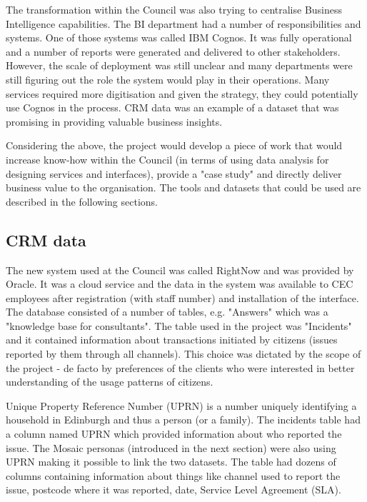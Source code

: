The transformation within the Council was also trying to centralise Business Intelligence capabilities. The BI department had a number of responsibilities and systems. One of those systems was called IBM Cognos. It was fully operational and a number of reports were generated and delivered to other stakeholders. However, the scale of deployment was still unclear and many departments were still figuring out the role the system would play in their operations. Many services required more digitisation and given the strategy, they could potentially use Cognos in the process. CRM data was an example of a dataset that was promising in providing valuable business insights.

Considering the above, the project would develop a piece of work that would increase know-how within the Council (in terms of using data analysis for designing services and interfaces), provide a "case study" and directly deliver business value to the organisation. The tools and datasets that could be used are described in the following sections.

		\subsection{CRM data}
		
The new system used at the Council was called RightNow and was provided by Oracle. It was a cloud service and the data in the system was available to CEC employees after registration (with staff number) and installation of the interface. The database consisted of a number of tables, e.g. "Answers" which was a "knowledge base for consultants". The table used in the project was "Incidents" and it contained information about transactions initiated by citizens (issues reported by them through all channels). This choice was dictated by the scope of the project - de facto by preferences of the clients who were interested in better understanding of the usage patterns of citizens.

Unique Property Reference Number (UPRN) is a number uniquely identifying a household in Edinburgh and thus a person (or a family). The incidents table had a column named UPRN which provided information about who reported the issue. The Mosaic personas (introduced in the next section) were also using UPRN making it possible to link the two datasets. The table had dozens of columns containing information about things like channel used to report the issue, postcode where it was reported, date, Service Level Agreement (SLA).

